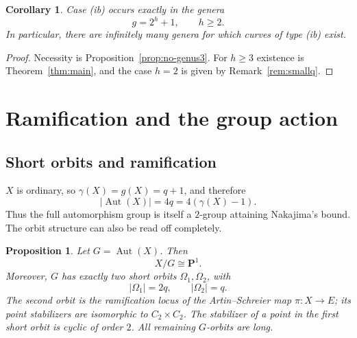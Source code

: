 \documentclass[11pt]{article}
\newtheorem{proposition}[theorem]{Proposition}
\newtheorem{corollary}[theorem]{Corollary}
\theoremstyle{remark}
\newcommand{\Aut}{\operatorname{Aut}}
\begin{document}
\begin{corollary}\label{cor:problem11}
Case \textup{(ib)} occurs exactly in the genera
\[
        g=2^h+1,\qquad h\ge2.
\]
In particular, there are infinitely many genera for which curves of type
\textup{(ib)} exist.
\end{corollary}

\begin{proof}
Necessity is Proposition~\ref{prop:no-genus3}.  For $h\ge3$ existence is
Theorem~\ref{thm:main}, and the case $h=2$ is given by
Remark~\ref{rem:smallq}.
\end{proof}


\section{Ramification and the group action}\label{sec:shortorbits}

\subsection{Short orbits and ramification}

$X$ is ordinary, so $\gamma(X)=g(X)=q+1$, and therefore
\[
 |\Aut(X)|=4q=4(\gamma(X)-1).
\]
Thus the full automorphism group is itself a $2$-group attaining
Nakajima's bound.  The orbit structure can also be read off completely.

\begin{proposition}\label{prop:shortorbits}
Let $G=\Aut(X)$.  Then
\[
 X/G\cong \mathbf P^1.
\]
Moreover, $G$ has exactly two short orbits $\Omega_1,\Omega_2$, with
\[
 |\Omega_1|=2q,\qquad |\Omega_2|=q.
\]
The second orbit is the ramification locus of the Artin--Schreier map
$\pi:X\to E$; its point stabilizers are isomorphic to $C_2\times C_2$.
The stabilizer of a point in the first short orbit is cyclic of order $2$.
All remaining $G$-orbits are long.
\end{proposition}
\end{document}
